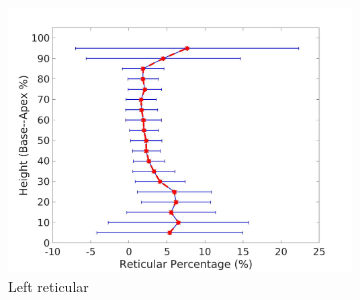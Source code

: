 \begin{figure}[H]
\begin{subfigure}{.42\linewidth}
  \includegraphics[width=\linewidth,trim={{.0\wd0} {.0\wd0} {.0\wd0} {.0\wd0}},clip]{QuantitativeAnalysis/Image/LeftLungReticularDiseaseAgainstHeight.jpg} %
  \caption{Left reticular}
  \label{fig:DiseaseAgainstHeight-c} 
\end{subfigure} 
\begin{subfigure}{.42\linewidth}%

\end{subfigure}
\end{figure}
